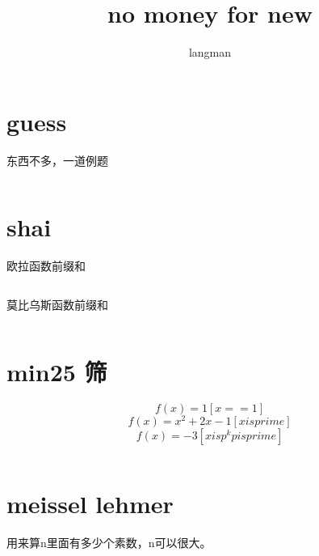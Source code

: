 \documentclass[a4paper,13.6pt]{article}
\author{langman}
\title{no money for new}
\begin{document}
\begin{CJK}{UTF8}{gbsn}
\section{guess}
东西不多，一道例题
\inputminted{c++}{../../scoure/other/a.cpp}
\section{shai}
欧拉函数前缀和
\inputminted{c++}{../../scoure/other/b.cpp}
莫比乌斯函数前缀和
\inputminted{c++}{../../scoure/other/c.cpp}
\section{ min25 筛}

$$f(x) = 1 [x == 1]$$
$$f(x) = x^2+2x-1 [x is prime]$$
$$f(x) = -3 [x is p^k p is prime]$$
\inputminted{c++}{../../scoure/other/d.cpp}

\section{meissel lehmer}
用来算n里面有多少个素数，n可以很大。
\inputminted{c++}{../../scoure/other/e.cpp}

\end{CJK}
\end{document}
